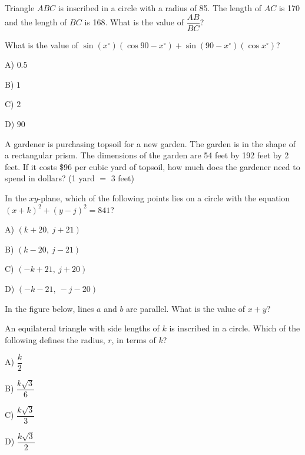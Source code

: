 \vfill
\noindent\begin{minipage}{\linewidth}
\par\smallskip
Triangle $ABC$ is inscribed in a circle with a radius of 85. The length of $AC$ is 170 and the length of $BC$ is 168. What is the value of $\dfrac{AB}{BC}$?
\end{minipage}
\vfill
\noindent\begin{minipage}{\linewidth}
\par\smallskip
What is the value of $\sin(x^\circ)(\cos 90-x^\circ)+\sin(90-x^\circ)(\cos x^\circ)$?
\begin{satchoices}
  \item[A)] $0.5$
  \item[B)] $1$
  \item[C)] $2$
  \item[D)] $90$
\end{satchoices}
\end{minipage}
\vfill
\clearpage
\noindent\begin{minipage}{\linewidth}
\par\smallskip
A gardener is purchasing topsoil for a new garden. The garden is in the shape of a rectangular prism. The dimensions of the garden are 54 feet by 192 feet by 2 feet. If it costs \$96 per cubic yard of topsoil, how much does the gardener need to spend in dollars? (1 yard $=$ 3 feet)
\end{minipage}
\vfill
\noindent\begin{minipage}{\linewidth}
\par\smallskip
In the $xy$-plane, which of the following points lies on a circle with the equation $(x+k)^2+(y-j)^2=841$?
\begin{satchoices}
  \item[A)] $(k+20,\ j+21)$
  \item[B)] $(k-20,\ j-21)$
  \item[C)] $(-k+21,\ j+20)$
  \item[D)] $(-k-21,\ -j-20)$
\end{satchoices}
\end{minipage}
\vfill
\noindent\begin{minipage}{\linewidth}
\par\smallskip
In the figure below, lines $a$ and $b$ are parallel. What is the value of $x+y$?
\satfig{\figparallelab}
\satnotetoscale
\end{minipage}
\vfill
\clearpage
\noindent\begin{minipage}{\linewidth}
\par\smallskip
An equilateral triangle with side lengths of $k$ is inscribed in a circle. Which of the following defines the radius, $r$, in terms of $k$?
\begin{satchoices}
  \item[A)] $\dfrac{k}{2}$
  \item[B)] $\dfrac{k\sqrt{3}}{6}$
  \item[C)] $\dfrac{k\sqrt{3}}{3}$
  \item[D)] $\dfrac{k\sqrt{3}}{2}$
\end{satchoices}
\end{minipage}
